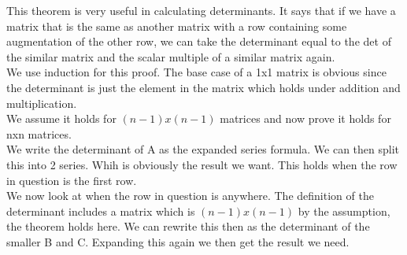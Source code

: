 \documentclass[12pt]{article}
\begin{document}
\begin{explanation}{}
    This theorem is very useful in calculating determinants. It says that if we have a matrix that is the same as another matrix with a row containing some augmentation of the other row, we can take the determinant equal to the det of the similar matrix and the scalar multiple of a similar matrix again.\\
We use induction for this proof. The base case of a 1x1 matrix is obvious since the determinant is just the element in the matrix which holds under addition and multiplication.\\
We assume it holds for $(n-1)x(n-1)$ matrices and now prove it holds for nxn matrices.\\
We write the determinant of A as the expanded series formula. We can then split this into 2 series. Whih is obviously the result we want. This holds when the row in question is the first row.\\
We now look at when the row in question is anywhere. The definition of the determinant includes a matrix which is $(n-1)x(n-1)$ by the assumption, the theorem holds here. We can rewrite this then as the determinant of the smaller B and C. Expanding this again we then get the result we need.\\
\end{explanation}
\end{document}

